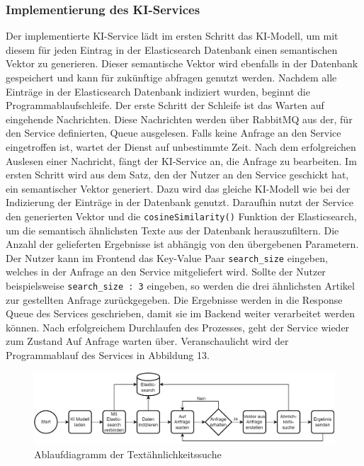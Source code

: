 \subsubsection{Implementierung des KI-Services}
Der implementierte KI-Service lädt im ersten Schritt das KI-Modell, um mit diesem für jeden Eintrag in der Elasticsearch Datenbank einen semantischen Vektor zu generieren. Dieser semantische Vektor wird ebenfalls in der Datenbank gespeichert und kann für zukünftige abfragen genutzt werden.
Nachdem alle Einträge in der Elasticsearch Datenbank indiziert wurden, beginnt die Programmablaufschleife. Der erste Schritt der Schleife ist das Warten auf eingehende Nachrichten. Diese Nachrichten werden über RabbitMQ aus der, für den Service definierten, Queue ausgelesen. Falls keine Anfrage an den Service eingetroffen ist, wartet der Dienst auf unbestimmte Zeit. Nach dem erfolgreichen Auslesen einer Nachricht, fängt der KI-Service an, die Anfrage zu bearbeiten. Im ersten Schritt wird aus dem Satz, den der Nutzer an den Service geschickt hat, ein semantischer Vektor generiert. Dazu wird das gleiche KI-Modell wie bei der Indizierung der Einträge in der Datenbank genutzt. Daraufhin nutzt der Service den generierten Vektor und die \texttt{cosineSimilarity()} Funktion der Elasticsearch, um die semantisch ähnlichsten Texte aus der Datenbank herauszufiltern. Die Anzahl der gelieferten Ergebnisse ist abhängig von den übergebenen Parametern. Der Nutzer kann im Frontend das Key-Value Paar \texttt{search\_{}size} eingeben, welches in der Anfrage an den Service mitgeliefert wird. Sollte der Nutzer beispielsweise \texttt{\glqq search\_{}size : 3\grqq{}} eingeben, so werden die drei ähnlichsten Artikel zur gestellten Anfrage zurückgegeben. Die Ergebnisse werden in die Response Queue des Services geschrieben, damit sie im Backend weiter verarbeitet werden können. Nach erfolgreichem Durchlaufen des Prozesses, geht der Service wieder zum Zustand \glqq Auf Anfrage warten\grqq{} über. Veranschaulicht wird der Programmablauf des Services in Abbildung 13.

\begin{figure}[H]
  \centering
    \includegraphics[width = 15cm]{bilder/KIAblauf}
    \caption{Ablaufdiagramm der Textähnlichkeitssuche}
\end{figure}

